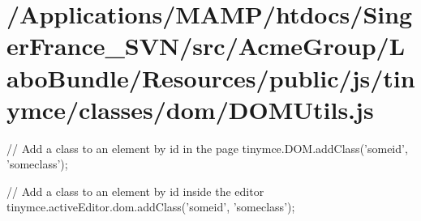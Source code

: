 \hypertarget{_2_applications_2_m_a_m_p_2htdocs_2_singer_france__s_v_n_2src_2_acme_group_2_labo_bundle_2_resou66bfdfb3504e8cc292fe18c0affa13a2}{\section{/\+Applications/\+M\+A\+M\+P/htdocs/\+Singer\+France\+\_\+\+S\+V\+N/src/\+Acme\+Group/\+Labo\+Bundle/\+Resources/public/js/tinymce/classes/dom/\+D\+O\+M\+Utils.\+js}
}
// Add a class to an element by id in the page tinymce.\+D\+O\+M.\+add\+Class('someid', 'someclass');

// Add a class to an element by id inside the editor tinymce.\+active\+Editor.\+dom.\+add\+Class('someid', 'someclass');


\begin{DoxyCodeInclude}
\end{DoxyCodeInclude}
 